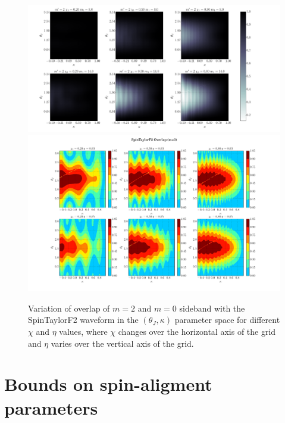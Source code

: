 \label{fig:P2}  \begin{figure}[t]
\includegraphics[width=\textwidth]{./images/OVLP_GRID_P2.pdf}
\includegraphics[width=\textwidth]{./images/OVLP_GRID_P0.pdf} \caption{Variation
of overlap of $m=2$ and $m=0$ sideband with the SpinTaylorF2
waveform in the $(\theta_J, \kappa)$ parameter space for  different $\chi$ and
$\eta$ values, where $\chi$ changes over the horizontal  axis of the grid and
$\eta$ varies over the vertical axis of the grid.}  
\centering  
\end{figure}

\section{Bounds on spin-aligment parameters}












































